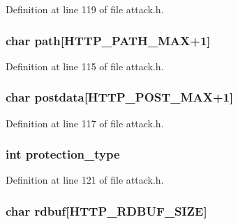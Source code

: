 Definition at line 119 of file attack.\+h.

\subsubsection[{\texorpdfstring{path}{path}}]{\setlength{\rightskip}{0pt plus 5cm}char path\mbox{[}{\bf H\+T\+T\+P\+\_\+\+P\+A\+T\+H\+\_\+\+M\+AX}+1\mbox{]}}\hypertarget{structattack__http__state_a216095570e2e489ac34fde8ed76a7c72}{}\label{structattack__http__state_a216095570e2e489ac34fde8ed76a7c72}


Definition at line 115 of file attack.\+h.

\subsubsection[{\texorpdfstring{postdata}{postdata}}]{\setlength{\rightskip}{0pt plus 5cm}char postdata\mbox{[}{\bf H\+T\+T\+P\+\_\+\+P\+O\+S\+T\+\_\+\+M\+AX}+1\mbox{]}}\hypertarget{structattack__http__state_ae3764fb7c9266b7fcf63ac9213c956d3}{}\label{structattack__http__state_ae3764fb7c9266b7fcf63ac9213c956d3}


Definition at line 117 of file attack.\+h.

\subsubsection[{\texorpdfstring{protection\+\_\+type}{protection_type}}]{\setlength{\rightskip}{0pt plus 5cm}int protection\+\_\+type}\hypertarget{structattack__http__state_a0065f11b6f92dfe81a17ad6d00c38e56}{}\label{structattack__http__state_a0065f11b6f92dfe81a17ad6d00c38e56}


Definition at line 121 of file attack.\+h.

\subsubsection[{\texorpdfstring{rdbuf}{rdbuf}}]{\setlength{\rightskip}{0pt plus 5cm}char rdbuf\mbox{[}{\bf H\+T\+T\+P\+\_\+\+R\+D\+B\+U\+F\+\_\+\+S\+I\+ZE}\mbox{]}}\hypertarget{structattack__http__state_af25afdcfe34a5d58999517c10dd10b08}{}\label{structattack__http__state_af25afdcfe34a5d58999517c10dd10b08}


